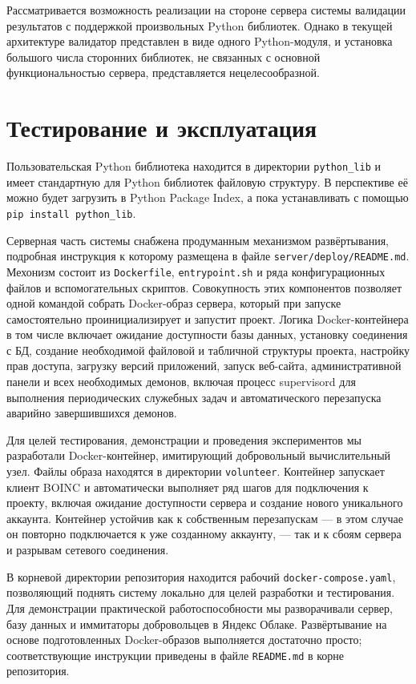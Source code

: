 \documentclass[a4paper,12pt]{extarticle}
\begin{document}
Рассматривается возможность реализации на стороне сервера системы валидации результатов с поддержкой произвольных Python библиотек. Однако в текущей архитектуре валидатор представлен в виде одного Python-модуля, и установка большого числа сторонних библиотек, не связанных с основной функциональностью сервера, представляется нецелесообразной.

\section{Тестирование и эксплуатация}

Пользовательская Python библиотека находится в директории \texttt{python\_lib} и имеет стандартную для Python библиотек файловую структуру. В перспективе её можно будет загрузить в Python Package Index, а пока устанавливать с помощью \texttt{pip install python\_lib}.

Серверная часть системы снабжена продуманным механизмом развёртывания, подробная инструкция к которому размещена в файле \texttt{server/deploy/README.md}. Мехонизм состоит из \texttt{Dockerfile}, \texttt{entrypoint.sh} и ряда конфигурационных файлов и вспомогательных скриптов. Совокупность этих компонентов позволяет одной командой собрать Docker-образ сервера, который при запуске самостоятельно проинициализирует и запустит проект. Логика Docker-контейнера в том числе включает ожидание доступности базы данных, установку соединения с БД, создание необходимой файловой и табличной структуры проекта, настройку прав доступа, загрузку версий приложений, запуск веб-сайта, административной панели и всех необходимых демонов, включая процесс supervisord для выполнения периодических служебных задач и автоматического перезапуска аварийно завершившихся демонов.

Для целей тестирования, демонстрации и проведения экспериментов мы разработали Docker-контейнер, имитирующий добровольный вычислительный узел. Файлы образа находятся в директории \texttt{volunteer}. Контейнер запускает клиент BOINC и автоматически выполняет ряд шагов для подключения к проекту, включая ожидание доступности сервера и создание нового уникального аккаунта. Контейнер устойчив как к собственным перезапускам — в этом случае он повторно подключается к уже созданному аккаунту, — так и к сбоям сервера и разрывам сетевого соединения.

В корневой директории репозитория находится рабочий \texttt{docker-compose.yaml}, позволяющий поднять систему локально для целей разработки и тестирования. Для демонстрации практической работоспособности мы разворачивали сервер, базу данных и иммитаторы добровольцев в Яндекс Облаке. Развёртывание на основе подготовленных Docker-образов выполняется достаточно просто; соответствующие инструкции приведены в файле \texttt{README.md} в корне репозитория.
\end{document}
